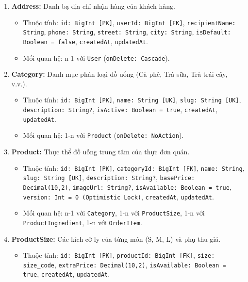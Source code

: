\documentclass[11pt,a4paper]{article}
\begin{document}
\begin{enumerate}[leftmargin=*,resume]
    \item \textbf{Address:} Danh bạ địa chỉ nhận hàng của khách hàng.
    \begin{itemize}[leftmargin=*,noitemsep]
        \item Thuộc tính: \texttt{id: BigInt [PK]}, \texttt{userId: BigInt [FK]}, \texttt{recipientName: String}, \texttt{phone: String}, \texttt{street: String}, \texttt{city: String}, \texttt{isDefault: Boolean = false}, \texttt{createdAt}, \texttt{updatedAt}.
        \item Mối quan hệ: n-1 với \texttt{User} (\texttt{onDelete: Cascade}).
    \end{itemize}
    \item \textbf{Category:} Danh mục phân loại đồ uống (Cà phê, Trà sữa, Trà trái cây, v.v.).
    \begin{itemize}[leftmargin=*,noitemsep]
        \item Thuộc tính: \texttt{id: BigInt [PK]}, \texttt{name: String [UK]}, \texttt{slug: String [UK]}, \texttt{description: String?}, \texttt{isActive: Boolean = true}, \texttt{createdAt}, \texttt{updatedAt}.
        \item Mối quan hệ: 1-n với \texttt{Product} (\texttt{onDelete: NoAction}).
    \end{itemize}
    \item \textbf{Product:} Thực thể đồ uống trung tâm của thực đơn quán.
    \begin{itemize}[leftmargin=*,noitemsep]
        \item Thuộc tính: \texttt{id: BigInt [PK]}, \texttt{categoryId: BigInt [FK]}, \texttt{name: String}, \texttt{slug: String [UK]}, \texttt{description: String?}, \texttt{basePrice: Decimal(10,2)}, \texttt{imageUrl: String?}, \texttt{isAvailable: Boolean = true}, \texttt{version: Int = 0 (Optimistic Lock)}, \texttt{createdAt}, \texttt{updatedAt}.
        \item Mối quan hệ: n-1 với \texttt{Category}, 1-n với \texttt{ProductSize}, 1-n với \texttt{ProductIngredient}, 1-n với \texttt{OrderItem}.
    \end{itemize}
    \item \textbf{ProductSize:} Các kích cỡ ly của từng món (S, M, L) và phụ thu giá.
    \begin{itemize}[leftmargin=*,noitemsep]
        \item Thuộc tính: \texttt{id: BigInt [PK]}, \texttt{productId: BigInt [FK]}, \texttt{size: size\_code}, \texttt{extraPrice: Decimal(10,2)}, \texttt{isAvailable: Boolean = true}, \texttt{createdAt}, \texttt{updatedAt}.

\end{itemize}
\end{enumerate}
\end{document}

